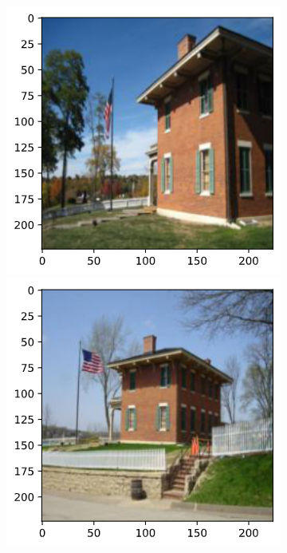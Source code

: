 \documentclass[10pt,twocolumn,letterpaper]{article}
\begin{document}
\begin{figure}[]
    \centering
    \begin{minipage}[t]{0.23\textwidth}
        \includegraphics[width=\textwidth]{COMP4471_Final_Report/img/169630_01.png}
    \end{minipage}
    \begin{minipage}[t]{0.23\textwidth}
        \includegraphics[width=\textwidth]{COMP4471_Final_Report/img/169630_02.png}

\end{minipage}
\end{figure}
\end{document}
